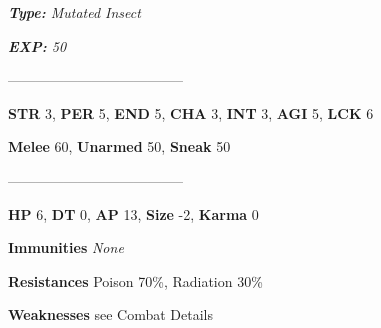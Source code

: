 \documentclass[11pt,a4paper,twocolumn]{book}
\begin{document}
	\noindent
	\emph{\textbf{Type:} Mutated Insect}
	
	\noindent
	\emph{\textbf{EXP:} 50}
	
%		
%	
%		
	
		--------------------------------------
		
		\noindent
		\textbf{STR} 3, \textbf{PER} 5, \textbf{END} 5, \textbf{CHA} 3, \textbf{INT} 3, \textbf{AGI} 5, \textbf{LCK} 6
		
		\noindent
		\textbf{Melee} 60, \textbf{Unarmed} 50, \textbf{Sneak} 50
		
		--------------------------------------
		
		\noindent
		\textbf{HP} 6, \textbf{DT} 0, \textbf{AP} 13, \textbf{Size} -2, \textbf{Karma} 0
		
		
		\noindent
		\textbf{Immunities} \emph{None}
		
		\noindent
		\textbf{Resistances} Poison 70\%, Radiation 30\%
		
		\noindent
		\textbf{Weaknesses} see Combat Details %
	
\end{document}

